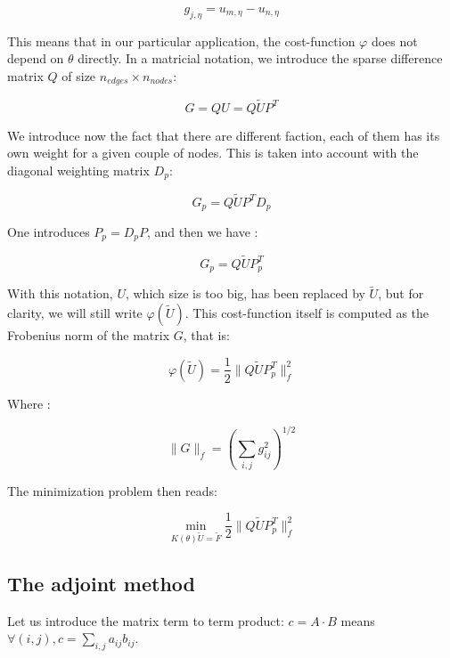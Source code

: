 \documentclass[11pt,a4paper]{article}  %
\begin{document}
\begin{equation}
g_{j,\eta} = u_{m,\eta}-u_{n,\eta}
\end{equation}

This means that in our particular application, the cost-function $\varphi$ does not depend on $\theta$ directly. In a matricial notation, we introduce the sparse difference matrix $Q$ of size $n_{edges}\times n_{nodes}$:

\begin{equation}
G = QU = Q\tilde{U}P^T
\end{equation}

We introduce now the fact that there are different faction, each of them has its own weight for a given couple of nodes. This is taken into account with the diagonal weighting matrix $D_p$:

\begin{equation}
G_p = Q\tilde{U}P^TD_p
\end{equation}

One introduces $P_p = D_pP$, and then we have :

\begin{equation}
G_p = Q\tilde{U}P_p^T
\end{equation}

With this notation, $U$, which size is too big, has been replaced by $\tilde{U}$, but for clarity, we will still write $\varphi(\tilde{U})$. This cost-function itself is computed as the Frobenius norm of the matrix $G$, that is:

\begin{equation}\label{eqn:phi}
\varphi(\tilde{U}) = \dfrac{1}{2} \|Q\tilde{U}P_p^T\|_f^2
\end{equation}

Where :

\begin{equation}
\|G\|_f = \left(\sum_{i,j}g_{ij}^2\right)^{1/2}
\end{equation}

The minimization problem then reads:

\begin{equation}
\min_{K(\theta)\tilde{U} = \tilde{F}} \dfrac{1}{2} \|Q\tilde{U}P_p^T\|_f^2
\end{equation}

\subsection{The adjoint method}

Let us introduce the matrix term to term product: $c = A\cdot B$ means $\forall (i,j), c = \sum_{i,j} a_{ij} b_{ij}$.
\end{document}
